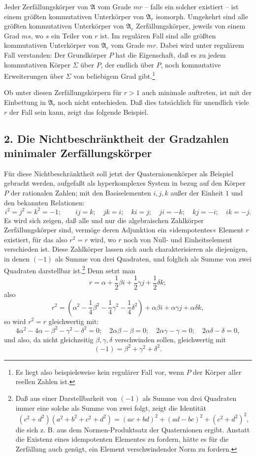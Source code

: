 \documentclass[11pt]{article}
\providecommand{\mA}{\mathfrak{A}}
\begin{document}
Jeder Zerfällungskörper von $\mA$ vom Grade $mr$ -- falls ein solcher existiert -- ist einem größten kommutativen Unterkörper von $\mA_r$ isomorph. Umgekehrt sind alle größten kommutativen Unterkörper von $\mA_r$ Zerfällungskörper, jeweils von einem Grad $ms$, wo $s$ ein Teiler von $r$ ist. Im regulären Fall sind alle größten kommutativen Unterkörper von $\mA_r$ vom Grade $mr$. Dabei wird unter regulärem Fall verstanden: Der Grundkörper $P$ hat die Eigenschaft, daß es zu jedem kommutativen Körper $\Sigma$ über $P$, der endlich über $P$, noch kommutative Erweiterungen über $\Sigma$ von beliebigem Grad gibt.\footnote{Es liegt also beispielsweise kein regulärer Fall vor, wenn $P$ der Körper aller reellen Zahlen ist.}

Ob unter diesen Zerfällungskörpern für $r>1$ auch minimale auftreten, ist mit der Einbettung in $\mA_r$ noch nicht entschieden. Daß dies tatsächlich für unendlich viele $r$ der Fall sein kann, zeigt das folgende Beispiel.

\subsection*{2. Die Nichtbeschränktheit der Gradzahlen minimaler Zerfällungskörper}

Für diese Nichtbeschränktheit soll jetzt der Quaternionenkörper als Beispiel gebracht werden, aufgefaßt als hyperkomplexes System in bezug auf den Körper $P$ der rationalen Zahlen; mit den Basiselementen $i,j,k$ außer der Einheit $1$ und den bekannten Relationen:
\[
 i^2=j^2=k^2=-1;\qquad ij=k;\quad jk=i;\quad ki=j;\quad ji=-k;\quad kj=-i;\quad ik=-j.
\]
Es wird sich zeigen, daß alle und nur die algebraischen Zahlkörper Zerfällungskörper sind, vermöge deren Adjunktion ein »idempotentes« Element $r$ existiert, für das also $r^2=r$ wird, wo $r$ noch von Null- und Einheitselement verschieden ist. Diese Zahlkörper lassen sich auch charakterisieren als diejenigen, in denen $(-1)$ als Summe von drei Quadraten, und folglich als Summe von zwei Quadraten darstellbar ist.\footnote{Daß aus einer Darstellbarkeit von $(-1)$ als Summe von drei Quadraten immer eine solche als Summe von zwei folgt, zeigt die Identität
\[
(c^2+d^2)(a^2+b^2+c^2+d^2)=(ac+bd)^2+(ad-bc)^2+(c^2+d^2)^2,
\]
die sich z. B. aus dem Normen-Produktsatz der Quaternionen ergibt. Anstatt die Existenz eines idempotenten Elementes zu fordern, hätte es für die Zerfällung auch genügt, ein Element verschwindender Norm zu fordern.} Denn setzt man
\[
        r=\alpha+\frac12\beta i+\frac12\gamma j+\frac12\delta k;
\]
also
\[
        r^2=\left(\alpha^2-\frac14\beta^2-\frac14\gamma^2-\frac14\delta^2\right)
          +\alpha\beta i+\alpha\gamma j+\alpha\delta k,
\]
so wird $r^2=r$ gleichwertig mit:
\[
4\alpha^2-4\alpha-\beta^2-\gamma^2-\delta^2=0;\quad
2\alpha\beta-\beta=0;\quad 2\alpha\gamma-\gamma=0;\quad 2\alpha\delta-\delta=0,
\]
und also, da nicht gleichzeitig $\beta,\gamma,\delta$ verschwinden sollen, gleichwertig mit
\[
        (-1)=\beta^2+\gamma^2+\delta^2.
\]
\end{document}

